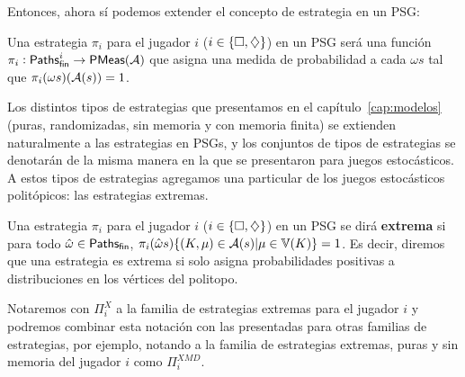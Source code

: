 Entonces, ahora sí podemos extender el concepto de estrategia en un PSG:

\begin{definition}
	Una estrategia $\pi_i$ para el jugador $i$ ($i \in \{\square, \diamondsuit\}$) en un PSG será una función $\pi_i : \textsf{Paths}_\textsf{fin}^i \rightarrow \textsf{PMeas}(\mathcal{A})$ que asigna una medida de probabilidad a cada $\omega s$ tal que $\pi_i(\omega s)(\mathcal{A}(s)) = 1$.
\end{definition}

Los distintos tipos de estrategias que presentamos en el
capítulo~\ref{cap:modelos} (puras, randomizadas, sin memoria y con memoria
finita) se extienden naturalmente a las estrategias en PSGs, y los conjuntos de
tipos de estrategias se denotarán de la misma manera en la que se presentaron
para juegos estocásticos. A estos tipos de estrategias agregamos una particular
de los juegos estocásticos politópicos: las estrategias extremas.

\begin{definition}
	Una estrategia $\pi_i$ para el jugador $i$ ($i \in \{\square, \diamondsuit\}$) en un PSG se dirá \textbf{extrema} si para todo $\hat \omega \in \textsf{Paths}_\textsf{fin}$, $\pi_i(\hat \omega s)\{(K, \mu) \in \mathcal{A}(s)| \mu \in \mathbb{V}(K)\} = 1$. Es decir, diremos que una estrategia es extrema si solo asigna probabilidades positivas a distribuciones en los vértices del politopo.

	Notaremos con $\Pi_i^X$ a la familia de estrategias extremas para el jugador
	$i$ y podremos combinar esta notación con las presentadas para otras familias
	de estrategias, por ejemplo, notando a la familia de estrategias extremas,
	puras y sin memoria del jugador $i$ como $\Pi_i^{XMD}$.
\end{definition}




